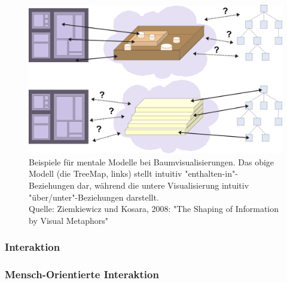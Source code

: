 			\begin{figure}
				\centering
				\includegraphics[width=0.8\linewidth]{mentalemodelle}
				\caption[Beispiele für mentale Modelle bei Baumvisualisierungen]{Beispiele für mentale Modelle bei Baumvisualisierungen. Das obige Modell (die TreeMap, links) stellt intuitiv "enthalten-in"-Beziehungen dar, während die untere Visualisierung intuitiv "über/unter"-Beziehungen darstellt.\\Quelle: Ziemkiewicz und Kosara, 2008: "The Shaping of Information by Visual Metaphors"}
				\label{fig:mentalemodelle}
			\end{figure}

			\subsubsection{Interaktion}

			\subsubsection{Mensch-Orientierte Interaktion}

